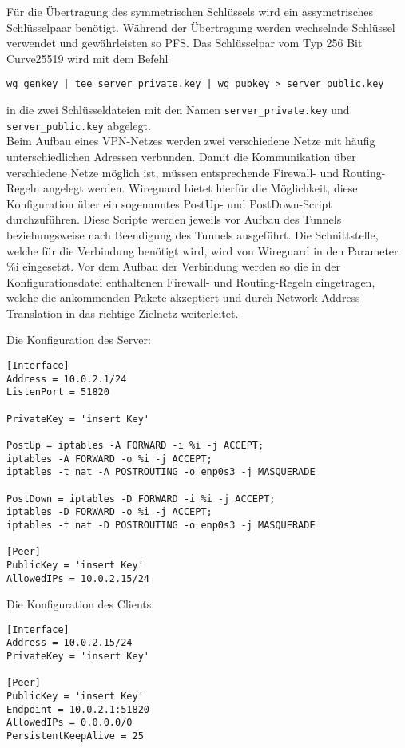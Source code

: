 \noindent F\"ur die \"Ubertragung des symmetrischen Schl\"ussels wird ein assymetrisches Schl\"usselpaar ben\"otigt. W\"ahrend der \"Ubertragung werden wechselnde Schl\"ussel verwendet und gew\"ahrleisten so \ac{PFS}. Das Schl\"usselpar vom Typ 256 Bit Curve25519 wird mit dem Befehl 
\begin{verbatim}
wg genkey | tee server_private.key | wg pubkey > server_public.key
\end{verbatim}
in die zwei Schl\"usseldateien mit den Namen \verb+server_private.key+ und \verb+server_public.key+ abgelegt.\\
Beim Aufbau eines VPN-Netzes werden zwei verschiedene Netze mit häufig unterschiedlichen Adressen verbunden. Damit die Kommunikation über verschiedene Netze möglich ist, müssen entsprechende Firewall- und Routing-Regeln angelegt werden. Wireguard bietet hierfür die Möglichkeit, diese Konfiguration über ein sogenanntes PostUp- und PostDown-Script durchzuführen. Diese Scripte werden jeweils vor Aufbau des Tunnels beziehungsweise nach Beendigung des Tunnels ausgeführt. Die Schnittstelle, welche für die Verbindung benötigt wird, wird von Wireguard in den Parameter \%i eingesetzt. Vor dem Aufbau der Verbindung werden so die in der Konfigurationsdatei enthaltenen Firewall- und Routing-Regeln eingetragen, welche die ankommenden Pakete akzeptiert und durch Network-Address-Translation in das richtige Zielnetz weiterleitet.  

\newpage
\noindent Die Konfiguration des Server:
\begin{verbatim}
[Interface]
Address = 10.0.2.1/24
ListenPort = 51820

PrivateKey = 'insert Key'

PostUp = iptables -A FORWARD -i %i -j ACCEPT; 
iptables -A FORWARD -o %i -j ACCEPT; 
iptables -t nat -A POSTROUTING -o enp0s3 -j MASQUERADE

PostDown = iptables -D FORWARD -i %i -j ACCEPT; 
iptables -D FORWARD -o %i -j ACCEPT; 
iptables -t nat -D POSTROUTING -o enp0s3 -j MASQUERADE

[Peer]  
PublicKey = 'insert Key'
AllowedIPs = 10.0.2.15/24
\end{verbatim}
\vspace{0.5cm}
\noindent Die Konfiguration des Clients:
\begin{verbatim}
[Interface]
Address = 10.0.2.15/24
PrivateKey = 'insert Key'

[Peer]  
PublicKey = 'insert Key'
Endpoint = 10.0.2.1:51820
AllowedIPs = 0.0.0.0/0
PersistentKeepAlive = 25
\end{verbatim}

